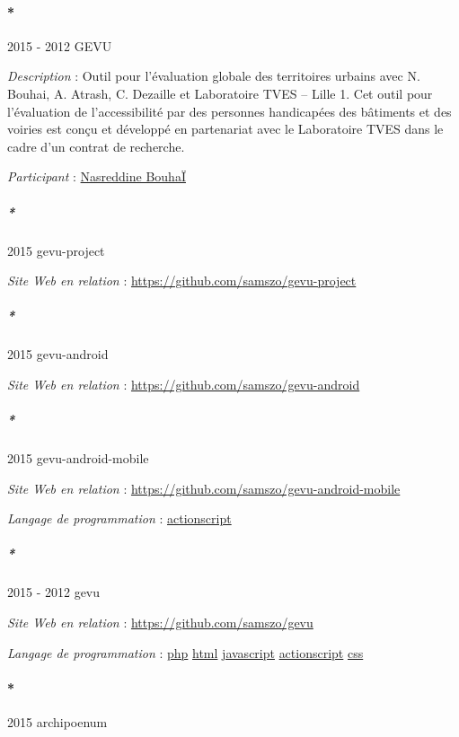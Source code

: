 \documentclass[
  a4paper,
  DIV=11,
  numbers=noendperiod]{scrreprt}
\let\oldparagraph\paragraph
\renewcommand{\paragraph}[1]{\oldparagraph{#1}\mbox{}}
\let\oldsubparagraph\subparagraph
\renewcommand{\subparagraph}[1]{\oldsubparagraph{#1}\mbox{}}
\begin{document}
\paragraph*{2015 - 2012 GEVU}\label{sec-item299740}

\emph{Description} : Outil pour l'évaluation globale des territoires
urbains avec N. Bouhai, A. Atrash, C. Dezaille et Laboratoire TVES --
Lille 1. Cet outil pour l'évaluation de l'accessibilité par des
personnes handicapées des bâtiments et des voiries est conçu et
développé en partenariat avec le Laboratoire TVES dans le cadre d'un
contrat de recherche.

\emph{Participant} :
\href{http://localhost/samszo/omk/s/fiches/item/61152}{Nasreddine
BouhaÏ}

\subparagraph*{2015 gevu-project}\label{sec-item301787}

\emph{Site Web en relation} :
\url{https://github.com/samszo/gevu-project}

\subparagraph*{2015 gevu-android}\label{sec-item301788}

\emph{Site Web en relation} :
\url{https://github.com/samszo/gevu-android}

\subparagraph*{2015 gevu-android-mobile}\label{sec-item301789}

\emph{Site Web en relation} :
\url{https://github.com/samszo/gevu-android-mobile}

\emph{Langage de programmation} :
\href{http://localhost/samszo/omk/s/fiches/item/158736}{actionscript}

\subparagraph*{2015 - 2012 gevu}\label{sec-item301793}

\emph{Site Web en relation} : \url{https://github.com/samszo/gevu}

\emph{Langage de programmation} :
\href{http://localhost/samszo/omk/s/fiches/item/108369}{php}
\href{http://localhost/samszo/omk/s/fiches/item/96621}{html}
\href{http://localhost/samszo/omk/s/fiches/item/89711}{javascript}
\href{http://localhost/samszo/omk/s/fiches/item/158736}{actionscript}
\href{http://localhost/samszo/omk/s/fiches/item/102418}{css}

\paragraph*{2015 archipoenum}\label{sec-item299747}
\end{document}
